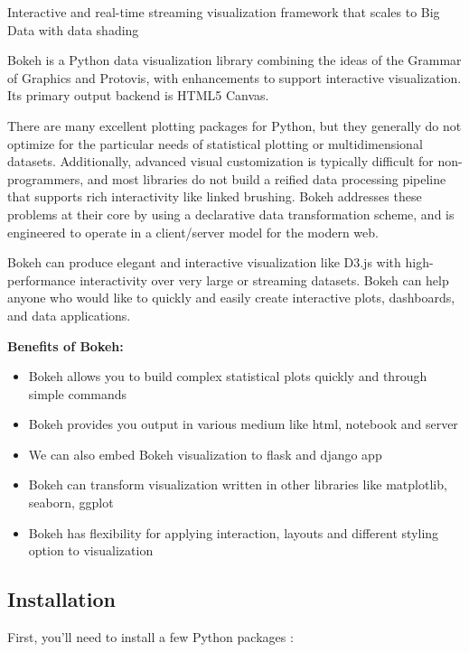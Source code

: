 \documentclass[a4paper,12pt]{article}
\begin{document}
Interactive and real-time streaming visualization framework that scales to Big Data with data shading

Bokeh is a Python data visualization library combining the ideas of the Grammar of Graphics and Protovis, with enhancements to support interactive visualization. Its primary output backend is HTML5 Canvas.

There are many excellent plotting packages for Python, but they generally do not optimize for the particular needs of statistical plotting or multidimensional datasets. Additionally, advanced visual customization is typically difficult for non-programmers, and most libraries do not build a reified data processing pipeline that supports rich interactivity like linked brushing. Bokeh addresses these problems at their core by using a declarative data transformation scheme, and is engineered to operate in a client/server model for the modern web.


Bokeh can produce elegant and interactive visualization like D3.js with high-performance interactivity over very large or streaming datasets. Bokeh can help anyone who would like to quickly and easily create interactive plots, dashboards, and data applications.
\begin{framed}
	\noindent \textbf{Benefits of Bokeh:}
	
	\begin{itemize}
		\item Bokeh allows you to build complex statistical plots quickly and through simple commands
		\item Bokeh provides you output in various medium like html, notebook and server
		\item We can also embed Bokeh visualization to flask and django app
		\item Bokeh can transform visualization written in other libraries like matplotlib, seaborn, ggplot
		\item Bokeh has flexibility for applying interaction, layouts and different styling option to visualization
	\end{itemize}
\end{framed}

\subsection*{Installation}
First, you’ll need to install a few Python packages :
\end{document}
